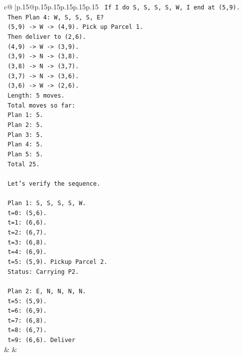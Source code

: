\documentclass{article}
\begin{document}
{\begin{supertabular}{c@{$\;$}|p{.15\linewidth}@{}p{.15\linewidth}p{.15\linewidth}p{.15\linewidth}p{.15\linewidth}p{.15\linewidth}}
{{{\texttt{      If I do S, S, S, S, W, I end at (5,9).} \\
\texttt{      Then Plan 4: W, S, S, S, E?} \\
\texttt{      (5,9) {-}> W {-}> (4,9). Pick up Parcel 1.} \\
\texttt{      Then deliver to (2,6).} \\
\texttt{      (4,9) {-}> W {-}> (3,9).} \\
\texttt{      (3,9) {-}> N {-}> (3,8).} \\
\texttt{      (3,8) {-}> N {-}> (3,7).} \\
\texttt{      (3,7) {-}> N {-}> (3,6).} \\
\texttt{      (3,6) {-}> W {-}> (2,6).} \\
\texttt{      Length: 5 moves.} \\
\texttt{      Total moves so far:} \\
\texttt{      Plan 1: 5.} \\
\texttt{      Plan 2: 5.} \\
\texttt{      Plan 3: 5.} \\
\texttt{      Plan 4: 5.} \\
\texttt{      Plan 5: 5.} \\
\texttt{      Total 25.} \\
\\ 
\texttt{      Let's verify the sequence.} \\
\\ 
\texttt{      Plan 1: S, S, S, S, W.} \\
\texttt{      t=0: (5,6).} \\
\texttt{      t=1: (6,6).} \\
\texttt{      t=2: (6,7).} \\
\texttt{      t=3: (6,8).} \\
\texttt{      t=4: (6,9).} \\
\texttt{      t=5: (5,9). Pickup Parcel 2.} \\
\texttt{      Status: Carrying P2.} \\
\\ 
\texttt{      Plan 2: E, N, N, N, N.} \\
\texttt{      t=5: (5,9).} \\
\texttt{      t=6: (6,9).} \\
\texttt{      t=7: (6,8).} \\
\texttt{      t=8: (6,7).} \\
\texttt{      t=9: (6,6). Deliver} \\
            }
        }
    }
    & & \\ \\


\end{supertabular}}
\end{document}
